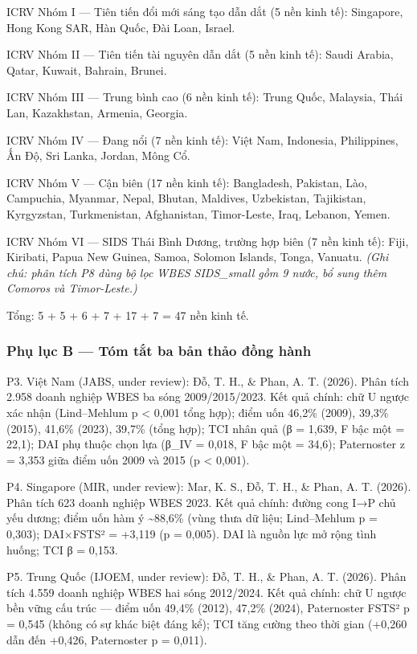 \documentclass[12pt,a4paper]{article}
\begin{document}
ICRV Nhóm I --- Tiên tiến đổi mới sáng tạo dẫn dắt (5 nền kinh tế):
Singapore, Hong Kong SAR, Hàn Quốc, Đài Loan, Israel.

ICRV Nhóm II --- Tiên tiến tài nguyên dẫn dắt (5 nền kinh tế): Saudi
Arabia, Qatar, Kuwait, Bahrain, Brunei.

ICRV Nhóm III --- Trung bình cao (6 nền kinh tế): Trung Quốc, Malaysia,
Thái Lan, Kazakhstan, Armenia, Georgia.

ICRV Nhóm IV --- Đang nổi (7 nền kinh tế): Việt Nam, Indonesia,
Philippines, Ấn Độ, Sri Lanka, Jordan, Mông Cổ.

ICRV Nhóm V --- Cận biên (17 nền kinh tế): Bangladesh, Pakistan, Lào,
Campuchia, Myanmar, Nepal, Bhutan, Maldives, Uzbekistan, Tajikistan,
Kyrgyzstan, Turkmenistan, Afghanistan, Timor-Leste, Iraq, Lebanon,
Yemen.

ICRV Nhóm VI --- SIDS Thái Bình Dương, trường hợp biên (7 nền kinh tế):
Fiji, Kiribati, Papua New Guinea, Samoa, Solomon Islands, Tonga,
Vanuatu. \emph{(Ghi chú: phân tích P8 dùng bộ lọc WBES SIDS\_small gồm 9
nước, bổ sung thêm Comoros và Timor-Leste.)}

Tổng: 5 + 5 + 6 + 7 + 17 + 7 = 47 nền kinh tế.

\hypertarget{phux1ee5-lux1ee5c-b--tuxf3m-tux1eaft-ba-bux1ea3n-thux1ea3o-ux111ux1ed3ng-huxe0nh}{%
\subsubsection{Phụ lục B --- Tóm tắt ba bản thảo đồng
hành}\label{phux1ee5-lux1ee5c-b--tuxf3m-tux1eaft-ba-bux1ea3n-thux1ea3o-ux111ux1ed3ng-huxe0nh}}

P3. Việt Nam (JABS, under review): Đỗ, T. H., \& Phan, A. T. (2026).
Phân tích 2.958 doanh nghiệp WBES ba sóng 2009/2015/2023. Kết quả chính:
chữ U ngược xác nhận (Lind--Mehlum p \textless{} 0,001 tổng hợp); điểm
uốn 46,2\% (2009), 39,3\% (2015), 41,6\% (2023), 39,7\% (tổng hợp); TCI
nhân quả (β = 1,639, F bậc một = 22,1); DAI phụ thuộc chọn lựa (β\_IV =
0,018, F bậc một = 34,6); Paternoster z = 3,353 giữa điểm uốn 2009 và
2015 (p \textless{} 0,001).

P4. Singapore (MIR, under review): Mar, K. S., Đỗ, T. H., \& Phan, A. T.
(2026). Phân tích 623 doanh nghiệp WBES 2023. Kết quả chính: đường cong
I→P chủ yếu dương; điểm uốn hàm ý \textasciitilde88,6\% (vùng thưa dữ
liệu; Lind--Mehlum p = 0,303); DAI×FSTS² = +3,119 (p = 0,005). DAI là
nguồn lực mở rộng tình huống; TCI β = 0,153.

P5. Trung Quốc (IJOEM, under review): Đỗ, T. H., \& Phan, A. T. (2026).
Phân tích 4.559 doanh nghiệp WBES hai sóng 2012/2024. Kết quả chính: chữ
U ngược bền vững cấu trúc --- điểm uốn 49,4\% (2012), 47,2\% (2024),
Paternoster FSTS² p = 0,545 (không có sự khác biệt đáng kể); TCI tăng
cường theo thời gian (+0,260 dẫn đến +0,426, Paternoster p = 0,011).
\end{document}
